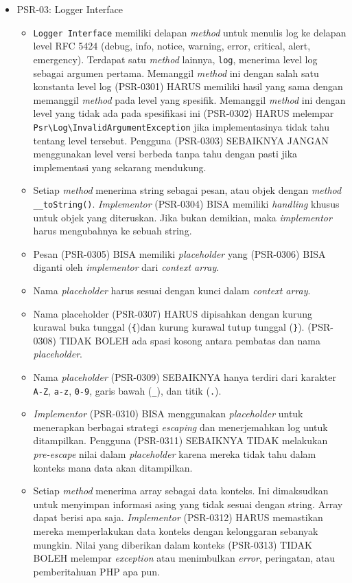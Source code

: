\documentclass[a4paper,twoside]{article}
\begin{document}
\begin{enumerate}
\begin{enumerate}
\begin{itemize}
				\item PSR-03: Logger Interface
				\begin{itemize}
					\item \verb|Logger Interface| memiliki delapan \textit{method} untuk menulis log ke delapan level RFC 5424 (debug, info, notice, warning, error, critical, alert, emergency). Terdapat satu \textit{method} lainnya, \verb|log|, menerima level log sebagai argumen pertama. Memanggil \textit{method} ini dengan salah satu konstanta level log (PSR-0301) HARUS memiliki hasil yang sama dengan memanggil \textit{method} pada level yang spesifik. Memanggil \textit{method} ini dengan level yang tidak ada pada spesifikasi ini (PSR-0302) HARUS melempar \verb|Psr\Log\InvalidArgumentException| jika implementasinya tidak tahu tentang level tersebut. Pengguna (PSR-0303) SEBAIKNYA JANGAN menggunakan level versi berbeda tanpa tahu dengan pasti jika implementasi yang sekarang mendukung. 
					\item Setiap \textit{method} menerima string sebagai pesan, atau objek dengan \textit{method} \verb|__toString()|. \textit{Implementor} (PSR-0304) BISA memiliki \textit{handling} khusus untuk objek yang diteruskan. Jika bukan demikian, maka \textit{implementor} harus mengubahnya ke sebuah string.
					\item Pesan (PSR-0305) BISA memiliki \textit{placeholder} yang (PSR-0306) BISA diganti oleh \textit{implementor} dari \textit{context array}.
					\item Nama \textit{placeholder} harus sesuai dengan kunci dalam \textit{context array}.
					\item Nama placeholder (PSR-0307) HARUS dipisahkan dengan kurung kurawal buka tunggal (\verb|{|)dan kurung kurawal tutup tunggal (\verb|}|). (PSR-0308) TIDAK BOLEH ada spasi kosong antara pembatas dan nama \textit{placeholder}.
					\item Nama \textit{placeholder} (PSR-0309) SEBAIKNYA hanya terdiri dari karakter \verb|A-Z|, \verb|a-z|, \verb|0-9|, garis bawah (\verb|_|), dan titik (\verb|.|).
					\item \textit{Implementor} (PSR-0310) BISA menggunakan \textit{placeholder} untuk menerapkan berbagai strategi \textit{escaping} dan menerjemahkan log untuk ditampilkan. Pengguna (PSR-0311) SEBAIKNYA TIDAK melakukan \textit{pre-escape} nilai dalam \textit{placeholder} karena mereka tidak tahu dalam konteks mana data akan ditampilkan. 
					\item Setiap \textit{method} menerima array sebagai data konteks. Ini dimaksudkan untuk menyimpan informasi asing yang tidak sesuai dengan string. Array dapat berisi apa saja. \textit{Implementor} (PSR-0312) HARUS memastikan mereka memperlakukan data konteks dengan kelonggaran sebanyak mungkin. Nilai yang diberikan dalam konteks (PSR-0313) TIDAK BOLEH melempar \textit{exception} atau menimbulkan \textit{error}, peringatan, atau pemberitahuan PHP apa pun.

\end{itemize}
\end{itemize}
\end{enumerate}
\end{enumerate}
\end{document}
